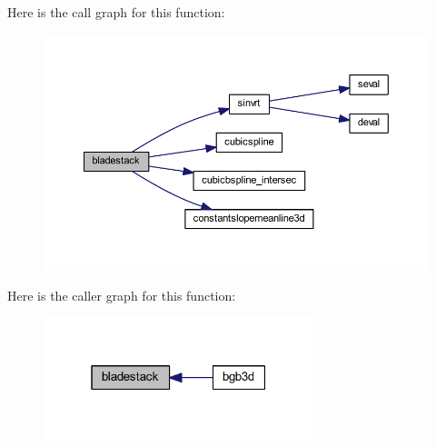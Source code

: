 Here is the call graph for this function\+:
\nopagebreak
\begin{figure}[H]
\begin{center}
\leavevmode
\includegraphics[width=350pt]{bladestack_8f90_a5dab74068855acf2e6917b70290ac7ec_cgraph}
\end{center}
\end{figure}




Here is the caller graph for this function\+:
\nopagebreak
\begin{figure}[H]
\begin{center}
\leavevmode
\includegraphics[width=223pt]{bladestack_8f90_a5dab74068855acf2e6917b70290ac7ec_icgraph}
\end{center}
\end{figure}


